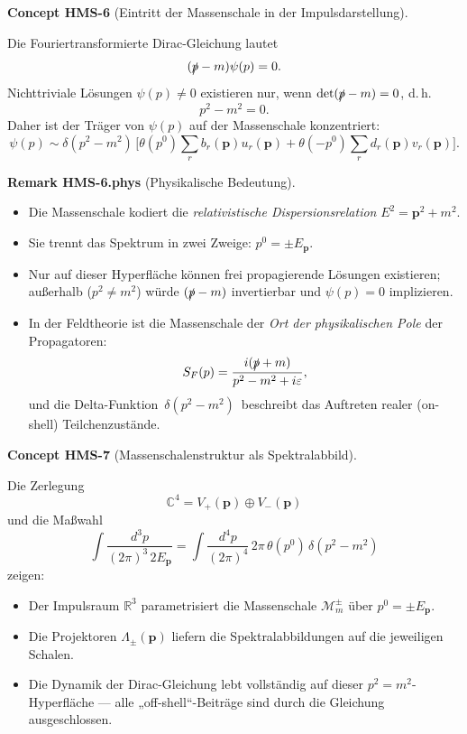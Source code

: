 \documentclass[10pt, letterpaper]{article}
\newcommand{\R}{\mathbb{R}}
\newcommand{\C}{\mathbb{C}}
\newcommand{\CustomHeading}[3]{%
  \par\medskip\noindent%
  \textbf{#1 #2} \textnormal{(#3)}.\enskip%
}
\newenvironment{REM}[2]{\begin{unitbox}\CustomHeading{Remark}{#1}{#2}}{\end{unitbox}}
\newenvironment{CONC}[2]{\begin{unitbox}\CustomHeading{Concept}{#1}{#2}}{\end{unitbox}}
\begin{document}
\begin{CONC}{HMS-6}{Eintritt der Massenschale in der Impulsdarstellung}
Die Fouriertransformierte Dirac-Gleichung lautet
\[
 (\slashed p - m)\psi(p)=0.
\]
Nichttriviale Lösungen $\psi(p)\neq0$ existieren nur, wenn $\det(\slashed p - m)=0$, d.\,h.
\[
 p^2-m^2=0.
\]
Daher ist der Träger von $\psi(p)$ auf der Massenschale konzentriert:
\[
 \psi(p)\sim\delta(p^2-m^2)\,\Big[\theta(p^0)\sum_r b_r(\mathbf p)u_r(\mathbf p)
 +\theta(-p^0)\sum_r d_r(\mathbf p)v_r(\mathbf p)\Big].
\]
\end{CONC}

\begin{REM}{HMS-6.phys}{Physikalische Bedeutung}
\begin{itemize}
\item Die Massenschale kodiert die \emph{relativistische Dispersionsrelation} $E^2=\mathbf p^2+m^2$.
\item Sie trennt das Spektrum in zwei Zweige: $p^0=\pm E_{\mathbf p}$.
\item Nur auf dieser Hyperfläche können frei propagierende Lösungen existieren; außerhalb ($p^2\neq m^2$) würde $(\slashed p - m)$ invertierbar und $\psi(p)=0$ implizieren.
\item In der Feldtheorie ist die Massenschale der \emph{Ort der physikalischen Pole} der Propagatoren:
  \[
   S_F(p)=\frac{i(\slashed p+m)}{p^2-m^2+i\varepsilon},
  \]
  und die Delta-Funktion $\,\delta(p^2-m^2)\,$ beschreibt das Auftreten realer (on-shell) Teilchenzustände.
\end{itemize}
\end{REM}

\begin{CONC}{HMS-7}{Massenschalenstruktur als Spektralabbild}
Die Zerlegung
\[
 \C^4=V_+(\mathbf p)\oplus V_-(\mathbf p)
\]
und die Maßwahl
\[
 \int\!\frac{d^3p}{(2\pi)^3\,2E_{\mathbf p}}
 = \int\!\frac{d^4p}{(2\pi)^4}\,2\pi\,\theta(p^0)\,\delta(p^2-m^2)
\]
zeigen:
\begin{itemize}
\item Der Impulsraum $\R^3$ parametrisiert die Massenschale $\mathcal M_m^\pm$ über $p^0=\pm E_{\mathbf p}$.
\item Die Projektoren $\Lambda_\pm(\mathbf p)$ liefern die Spektralabbildungen auf die jeweiligen Schalen.
\item Die Dynamik der Dirac-Gleichung lebt vollständig auf dieser $p^2=m^2$-Hyperfläche — alle „off-shell“-Beiträge sind durch die Gleichung ausgeschlossen.
\end{itemize}
\end{CONC}
\end{document}
